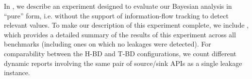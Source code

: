 In , we describe an experiment designed to evaluate our Bayesian analysis in ``pure'' form, i.e. without the support of information-flow tracking to detect relevant values. To make our description of this experiment complete, we include , which provides a detailed summary of the results of this experiment across all benchmarks (including ones on which no leakages were detected).
For comparability between the H-BD and T-BD configurations, we count different dynamic reports involving the same pair of source/sink APIs as a single leakage instance.

\begin{table*}
\setlength{\tabcolsep}{0.3em}
\begin{small}
\begin{center}
\end{center}
\end{small}
\end{table*}
